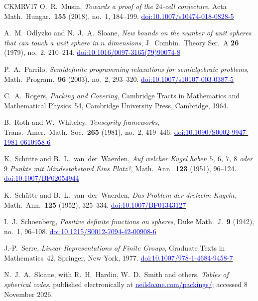 \documentclass[11pt,reqno]{amsart}
\newcommand{\bluelink}[2]{\href{#1}{\textcolor{blue}{#2}}}
\renewcommand{\_}{\origunderscore\allowbreak}
\numberwithin{equation}{section}
\theoremstyle{plain}
\theoremstyle{definition}
\theoremstyle{remark}
\begin{document}
\begin{thebibliography}{CKMRV17}
O.~R.~Musin,
\textit{Towards a proof of the $24$-cell conjecture},
Acta Math.\ Hungar.\ \textbf{155} (2018), no.~1, 184--199.
\bluelink{https://doi.org/10.1007/s10474-018-0828-5}{doi:10.1007/s10474-018-0828-5}

A.~M.~Odlyzko and N.~J.~A.~Sloane,
\textit{New bounds on the number of unit spheres that can touch a unit sphere in $n$ dimensions},
J.\ Combin.\ Theory Ser.\ A \textbf{26} (1979), no.~2, 210--214.
\bluelink{https://doi.org/10.1016/0097-3165(79)90074-8}{doi:10.1016/0097-3165(79)90074-8}

P.~A.~Parrilo,
\textit{Semidefinite programming relaxations for semialgebraic problems},
Math.\ Program.\ \textbf{96} (2003), no.~2, 293--320.
\bluelink{https://doi.org/10.1007/s10107-003-0387-5}{doi:10.1007/s10107-003-0387-5}

C.~A.~Rogers,
\textit{Packing and Covering},
Cambridge Tracts in Mathematics and Mathematical Physics~54,
Cambridge University Press, Cambridge, 1964.

B.~Roth and W.~Whiteley,
\textit{Tensegrity frameworks},
Trans.\ Amer.\ Math.\ Soc.\ \textbf{265} (1981), no.~2, 419--446.
\bluelink{https://doi.org/10.1090/S0002-9947-1981-0610958-6}{doi:10.1090/S0002-9947-1981-0610958-6}

K.~Sch\"utte and B.~L.~van~der~Waerden,
\textit{Auf welcher Kugel haben $5$, $6$, $7$, $8$ oder $9$ Punkte mit
Mindestabstand Eins Platz?},
Math.\ Ann.\ \textbf{123} (1951), 96--124.
\bluelink{https://doi.org/10.1007/BF02054944}{doi:10.1007/BF02054944}

K.~Sch\"utte and B.~L.~van~der~Waerden,
\textit{Das Problem der dreizehn Kugeln},
Math.\ Ann.\ \textbf{125} (1952), 325--334.
\bluelink{https://doi.org/10.1007/BF01343127}{doi:10.1007/BF01343127}

I.~J.~Schoenberg,
\textit{Positive definite functions on spheres},
Duke Math.\ J.\ \textbf{9} (1942), no.~1, 96--108.
\bluelink{https://doi.org/10.1215/S0012-7094-42-00908-6}{doi:10.1215/S0012-7094-42-00908-6}

J.-P.~Serre,
\textit{Linear Representations of Finite Groups},
Graduate Texts in Mathematics~42, Springer, New York, 1977.
\bluelink{https://doi.org/10.1007/978-1-4684-9458-7}{doi:10.1007/978-1-4684-9458-7}

N.~J.~A.~Sloane, with R.~H.~Hardin, W.~D.~Smith and others,
\textit{Tables of spherical codes}, published electronically at
\bluelink{https://neilsloane.com/packings/}{neilsloane.com/packings/};
accessed 8 November 2026.


\end{thebibliography}
\end{document}
